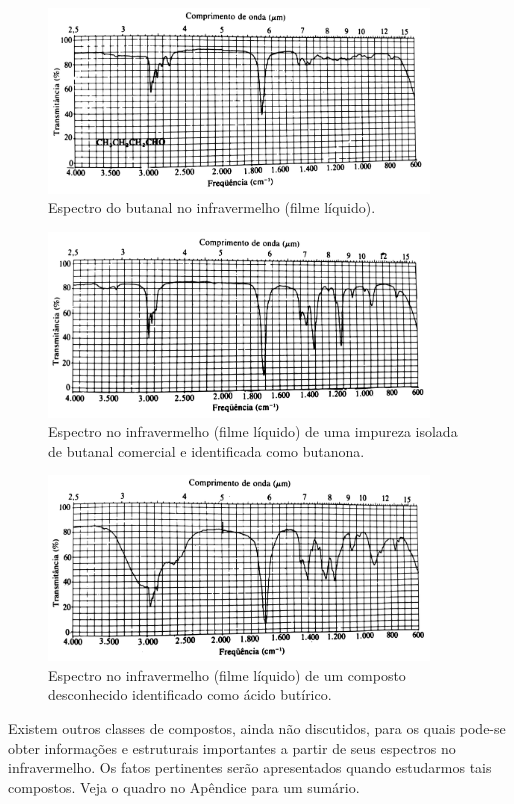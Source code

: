 \begin{figure}[h]
    \centering
    \includegraphics[width=0.9\textwidth,angle=0]{content/images/Figura_9_9.pdf}
    \caption{Espectro do butanal no infravermelho (filme líquido).}
    \label{figura_9_9}
\end{figure}

\begin{figure}[h]
    \centering
    \includegraphics[width=0.9\textwidth,angle=0]{content/images/Figura_9_10.pdf}
    \caption{Espectro no infravermelho (filme líquido) de uma impureza isolada de butanal comercial e identificada como butanona.}
    \label{figura_9_10}
\end{figure}

\begin{figure}[h]
    \centering
    \includegraphics[width=0.9\textwidth,angle=0]{content/images/Figura_9_11.pdf}
    \caption{Espectro no infravermelho (filme líquido) de um composto desconhecido identificado como ácido butírico.}
    \label{figura_9_11}
\end{figure}

Existem outros classes de compostos, ainda não discutidos, para os quais pode-se obter informações e estruturais importantes a partir de seus espectros no infravermelho. Os fatos pertinentes serão apresentados quando estudarmos tais compostos. Veja o quadro no Apêndice para um sumário.
